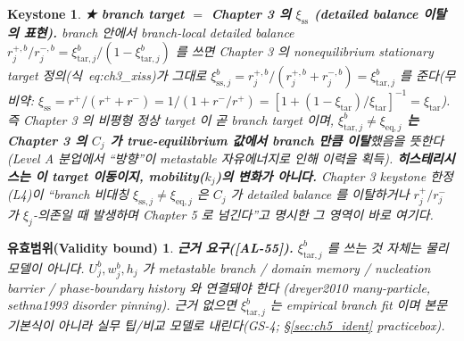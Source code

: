 \documentclass[11pt,a4paper]{article}
\newtheorem*{boundbox}{유효범위(Validity bound)}
\newtheorem*{keybox}{Keystone}
\newcommand{\eq}{\mathrm{eq}}
\newcommand{\tar}{\mathrm{tar}}
\newcommand{\sstat}{\mathrm{ss}}
\newcommand{\AL}[1]{\textsf{[AL-#1]}}
\begin{document}
\begin{keybox}
\textbf{★ branch target $=$ Chapter 3 의 $\xi_{\sstat}$ (detailed balance 이탈의 표현).} branch 안에서
branch-local detailed balance $r_j^{+,b}/r_j^{-,b}=\xi_{\tar,j}^b/(1-\xi_{\tar,j}^b)$ 를 쓰면 Chapter 3 의
nonequilibrium stationary target 정의(식~eq:ch3\_xiss)가 그대로
$\xi_{\sstat,j}^b=r_j^{+,b}/(r_j^{+,b}+r_j^{-,b})=\xi_{\tar,j}^b$ 를 준다(무비약: $\xi_{\sstat}=r^+/(r^++r^-)
=1/(1+r^-/r^+)=[1+(1-\xi_\tar)/\xi_\tar]^{-1}=\xi_\tar$). 즉 \emph{Chapter 3 의 비평형 정상 target 이 곧
branch target} 이며, \textbf{$\xi_{\tar,j}^b\ne\xi_{\eq,j}$ 는 Chapter 3 의 $C_j$ 가 true-equilibrium
값에서 branch 만큼 \emph{이탈}}했음을 뜻한다(Level A 분업에서 ``방향''이 metastable 자유에너지로 인해 이력을
획득). \textbf{히스테리시스는 이 \emph{target 이동}이지, mobility($k_j$)의 변화가 아니다.} Chapter 3 keystone
한정(L4)이 ``branch 비대칭 $\xi_{\sstat,j}\ne\xi_{\eq,j}$ 은 $C_j$ 가 detailed balance 를 이탈하거나
$r_j^+/r_j^-$ 가 $\xi_j$-의존일 때 발생하며 Chapter 5 로 넘긴다''고 명시한 그 영역이 바로 여기다.
\end{keybox}
\begin{boundbox}
\textbf{근거 요구(\AL{55}).} $\xi_{\tar,j}^b$ 를 쓰는 것 자체는 물리 모델이 아니다. $U_j^b,w_j^b,h_j$ 가
metastable branch / domain memory / nucleation barrier / phase-boundary history 와 연결돼야 한다
(dreyer2010 many-particle, sethna1993 disorder pinning). 근거 없으면 $\xi_{\tar,j}^b$ 는 empirical branch
fit 이며 본문 기본식이 아니라 실무 팁/비교 모델로 내린다(GS-4; \S\ref{sec:ch5_ident} practicebox).
\end{boundbox}
\end{document}
